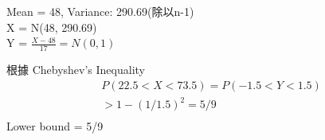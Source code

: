 \documentclass{article}
\begin{document}
\fontsize{15pt}{20pt}\selectfont

\begin{CJK}{UTF8}{bsmi} %
\noindent

Mean = 48, Variance: 290.69(除以n-1)\\
X = N(48, 290.69)\\
Y = $\frac{X-48}{17} = N(0,1)$

根據 Chebyshev’s Inequality
\begin{align*}
& P(22.5 < X < 73.5) = P(-1.5 < Y < 1.5)\\
& > 1-(1/1.5)^{2} = 5/9\\
\end{align*}
Lower bound = 5/9
\end{CJK} %
\end{document}
